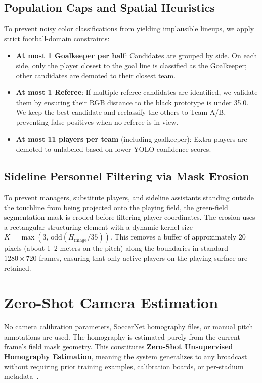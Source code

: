 \documentclass[11pt]{article}
\begin{document}
\subsection{Population Caps and Spatial Heuristics}

To prevent noisy color classifications from yielding implausible lineups, we apply strict football-domain constraints:
\begin{itemize}
    \item \textbf{At most 1 Goalkeeper per half}: Candidates are grouped by side. On each side, only the player closest to the goal line is classified as the Goalkeeper; other candidates are demoted to their closest team.
    \item \textbf{At most 1 Referee}: If multiple referee candidates are identified, we validate them by ensuring their RGB distance to the black prototype is under 35.0. We keep the best candidate and reclassify the others to Team A/B, preventing false positives when no referee is in view.
    \item \textbf{At most 11 players per team} (including goalkeeper): Extra players are demoted to unlabeled based on lower YOLO confidence scores.
\end{itemize}

\subsection{Sideline Personnel Filtering via Mask Erosion}

To prevent managers, substitute players, and sideline assistants standing outside the touchline from being projected onto the playing field, the green-field segmentation mask is eroded before filtering player coordinates. The erosion uses a rectangular structuring element with a dynamic kernel size $K = \max(3, \, \text{odd}(H_\text{image} / 35))$. This removes a buffer of approximately 20 pixels (about 1--2 meters on the pitch) along the boundaries in standard $1280 \times 720$ frames, ensuring that only active players on the playing surface are retained.

\section{Zero-Shot Camera Estimation}
\label{sec:zeroshot}

No camera calibration parameters, SoccerNet homography files, or manual pitch annotations are used. The homography is estimated purely from the current frame's field mask geometry. This constitutes \textbf{Zero-Shot Unsupervised Homography Estimation}, meaning the system generalizes to any broadcast without requiring prior training examples, calibration boards, or per-stadium metadata~.
\end{document}
